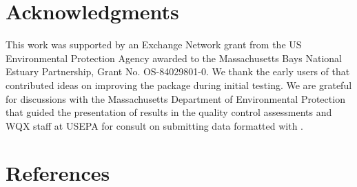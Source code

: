 \hypertarget{acknowledgments}{%
\section{Acknowledgments}\label{acknowledgments}}

This work was supported by an Exchange Network grant from the US Environmental Protection Agency awarded to the Massachusetts Bays National Estuary Partnership, Grant No. OS-84029801-0. We thank the early users of  that contributed ideas on improving the package during initial testing. We are grateful for discussions with the Massachusetts Department of Environmental Protection that guided the presentation of results in the quality control assessments and WQX staff at USEPA for consult on submitting data formatted with .

\hypertarget{references}{%
\section*{References}\label{references}}

